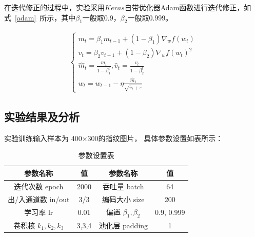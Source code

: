 \documentclass{whutmod}
\begin{document}
在迭代修正的过程中，实验采用$Keras$自带优化器Adam函数进行迭代修正，如式~\ref{adam}~所示，其中$\beta_{1}$一般取0.9，$\beta_{2}$一般取0.999。

\begin{gather*}\label{adam}
\left\{\begin{array}{l}{m_{t}=\beta_{1} m_{t-1}+\left(1-\beta_{1}\right) \nabla_{w} f\left(w_{t}\right)} \\ {v_{t}=\beta_{2} v_{t-1}+\left(1-\beta_{2}\right) \nabla_{w} f\left(w_{t}\right)^{2}} \\ {\widehat{m}_{t}=\frac{m_{t}}{1-\beta_{1}^{t}}, \hat{v}_{t}=\frac{v_{t}}{1-\beta_{2}^{t}}} \\ {w_{t}=w_{t-1}-\eta \frac{\widehat{m}_{t}}{\sqrt{\hat{v}_{t}+\varepsilon}}}\end{array}\right.
\end{gather*}

        \subsection{实验结果及分析}
        实验训练输入样本为 400×300的指纹图片， 具体参数设置如表所示：
       \begin{table}[H]
        	\centering		
        	\caption{参数设置表
        	}
        	\begin{tabular}{cc|cc}
        		\toprule[1.5pt]
        		\multicolumn{1}{m{5cm}}{\centering 参数名称}
        		& \multicolumn{1}{m{2cm}}{\centering 值}
        		&        		\multicolumn{1}{m{5cm}}{\centering 参数名称}
        		& \multicolumn{1}{m{2cm}}{\centering 值}
        		\\
        		\midrule[1pt]
        		迭代次数 epoch&   2000& 吞吐量 batch & 64\\ 
        	出/入通道数 in/out& 	3/3& 编码大小 size& 200\\
        	        学习率 lr& 0.01& 偏置 $\beta_1,\beta_2$& 0.9, 0.999\\
      卷积核 $k_1,k_2,k_3$& 3,3,4& 池化层 padding& 1\\
        		\bottomrule[1.5pt]	
        	\end{tabular}
        \end{table}
    
\end{document}
